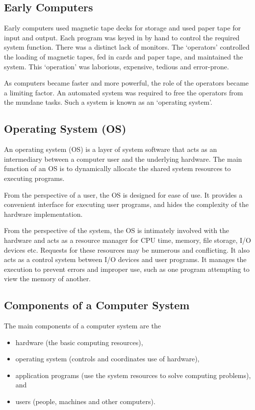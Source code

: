 \subsection{Early Computers}

Early computers used magnetic tape decks for storage and used paper tape for input and output.
Each program was keyed in by hand to control the required system function.
There was a distinct lack of monitors.
The `operators' controlled the loading of magnetic tapes, fed in cards and paper tape, and maintained the system.
This `operation' was laborious, expensive, tedious and error-prone.

As computers became faster and more powerful, the role of the operators became a limiting factor.
An automated system was required to free the operators from the mundane tasks.
Such a system is known as an `operating system'.

\subsection{Operating System (OS)}

An operating system (OS) is a layer of system software that acts as an intermediary between a computer user and the underlying hardware.
The main function of an OS is to dynamically allocate the shared system resources to executing programs.

From the perspective of a user, the OS is designed for ease of use.
It provides a convenient interface for executing user programs, and hides the complexity of the hardware implementation.

From the perspective of the system, the OS is intimately involved with the hardware and acts as a resource manager for CPU time, memory, file storage, I/O devices etc.
Requests for these resources may be numerous and conflicting.
It also acts as a control system between I/O devices and user programs.
It manages the execution to prevent errors and improper use, such as one program attempting to view the memory of another.

\subsection{Components of a Computer System}

The main components of a computer system are the
\begin{itemize}
  \item hardware (the basic computing resources),
  \item operating system (controls and coordinates use of hardware),
  \item application programs (use the system resources to solve computing problems), and
  \item users (people, machines and other computers).
\end{itemize}

